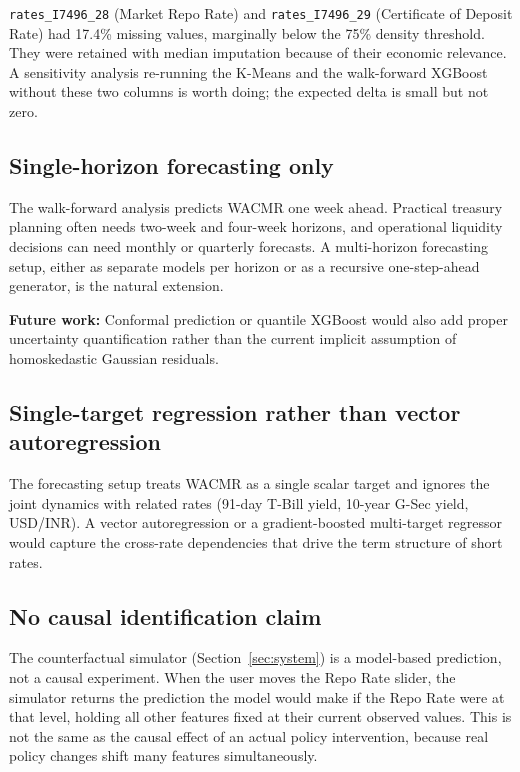 \texttt{rates\_I7496\_28} (Market Repo Rate) and
\texttt{rates\_I7496\_29} (Certificate of Deposit Rate) had 17.4\%
missing values, marginally below the 75\% density threshold. They
were retained with median imputation because of their economic
relevance. A sensitivity analysis re-running the K-Means and the
walk-forward XGBoost without these two columns is worth doing; the
expected delta is small but not zero.

\subsection{Single-horizon forecasting only}

The walk-forward analysis predicts WACMR one week ahead. Practical
treasury planning often needs two-week and four-week horizons, and
operational liquidity decisions can need monthly or quarterly
forecasts. A multi-horizon forecasting setup, either as separate
models per horizon or as a recursive one-step-ahead generator, is the
natural extension.

\textbf{Future work:} Conformal prediction or quantile XGBoost would
also add proper uncertainty quantification rather than the current
implicit assumption of homoskedastic Gaussian residuals.

\subsection{Single-target regression rather than vector autoregression}

The forecasting setup treats WACMR as a single scalar target and
ignores the joint dynamics with related rates (91-day T-Bill yield,
10-year G-Sec yield, USD/INR). A vector autoregression or a
gradient-boosted multi-target regressor would capture the cross-rate
dependencies that drive the term structure of short rates.

\subsection{No causal identification claim}

The counterfactual simulator (Section~\ref{sec:system}) is a
model-based prediction, not a causal experiment. When the user moves
the Repo Rate slider, the simulator returns the prediction the model
would make if the Repo Rate were at that level, holding all other
features fixed at their current observed values. This is not the same
as the causal effect of an actual policy intervention, because real
policy changes shift many features simultaneously.

